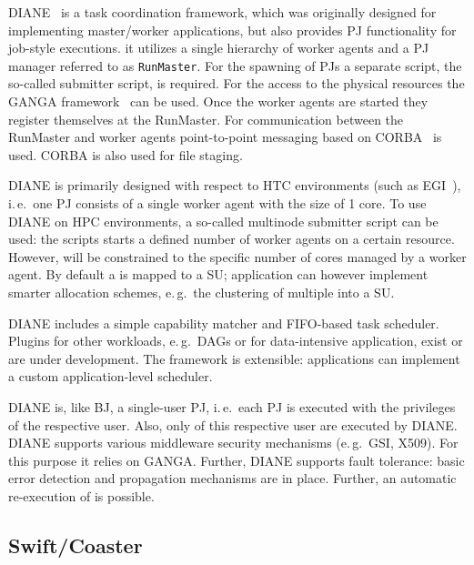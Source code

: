 \documentclass[conference]{IEEEtran}
\begin{document}
DIANE~\cite{Moscicki:908910} is a task coordination framework, which
was originally designed for implementing master/worker applications,
but also provides PJ functionality for job-style executions. it
utilizes a single hierarchy of worker agents and a PJ manager
referred to as \texttt{RunMaster}.
For the spawning of PJs a separate script, the so-called submitter script, is
required. For the access to the physical resources the GANGA
framework~\cite{Moscicki20092303} can be used.
Once the worker agents are started they register themselves at the RunMaster.
For communication between the RunMaster and worker agents point-to-point
messaging based on CORBA~\cite{OMG-CORBA303:2004} is used. CORBA is also used
for file staging.

DIANE is primarily designed with respect to HTC environments (such as
EGI~\cite{egi}), i.\,e.\ one PJ consists of a single worker agent with the
size of 1 core.
To use DIANE on HPC environments, a so-called multinode submitter script can be
used: the scripts starts a defined number of worker agents on a certain
resource.
However, \cus will be constrained to the specific number of cores
managed by a worker agent.
By default a \cu  is mapped to a SU; application can however implement smarter
allocation schemes, e.\,g.\ the clustering of multiple \cus into a SU.

DIANE includes a simple capability matcher and FIFO-based task scheduler.
Plugins for other workloads, e.\,g.\ DAGs or for data-intensive
application, exist or are under development. The framework is extensible:
applications can implement a custom application-level scheduler.


DIANE is, like BJ, a single-user PJ, i.\,e.\ each PJ is executed with the privileges
of the respective user. Also, only \cus of this respective user are executed
by DIANE. DIANE supports various middleware security mechanisms (e.\,g.\ GSI,
X509). For this purpose it relies on GANGA.
Further, DIANE supports fault tolerance: basic error detection and propagation
mechanisms are in place. Further, an automatic re-execution of \cus is
possible.






\subsection{Swift/Coaster}
\end{document}
